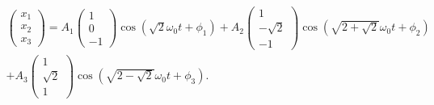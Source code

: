 \documentclass[letterpaper,12pt,oneside]{book}
\begin{document}
\begin{eqnarray}
\begin{pmatrix}
x_1\\
x_2 \\
x_3 
\end{pmatrix} = A_1 \begin{pmatrix}
1 \\
0 \\
-1 
\end{pmatrix}\cos\left(\sqrt{2}\omega_0 t + \phi_1\right) +  A_2 \begin{pmatrix}
1 \\
-\sqrt{2} \\
-1 
\end{pmatrix}\cos\left(\sqrt{2+\sqrt{2}}\omega_0 t + \phi_2\right) \nonumber\\+ 
A_3 \begin{pmatrix}
1 \\
\sqrt{2} \\
1 
\end{pmatrix}\cos\left(\sqrt{2-\sqrt{2}}\omega_0 t + \phi_3\right) \nonumber. 
\end{eqnarray}
%
\end{document}
